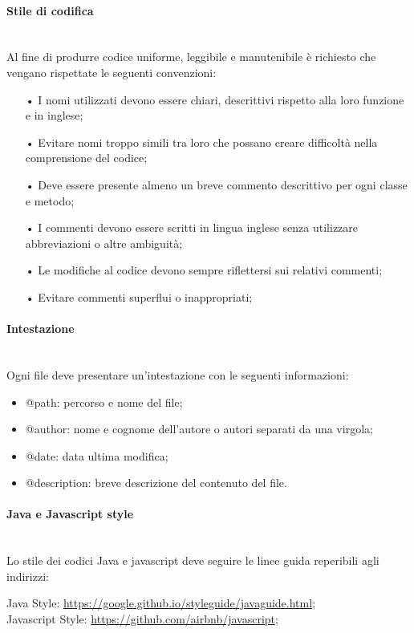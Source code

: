 \paragraph{Stile di codifica}\mbox{}\\
Al fine di produrre codice uniforme, leggibile e manutenibile è richiesto che vengano rispettate
le seguenti convenzioni:
\begin{itemize}
\item[•] I nomi utilizzati devono essere chiari, descrittivi rispetto alla loro funzione e in inglese;
\item[•] Evitare nomi troppo simili tra loro che possano creare difficoltà nella comprensione del codice;
\item[•] Deve essere presente almeno un breve commento descrittivo per ogni classe e metodo;
\item[•] I commenti devono essere scritti in lingua inglese senza utilizzare abbreviazioni o altre ambiguità;
\item[•] Le modifiche al codice devono sempre riflettersi sui relativi commenti;
\item[•] Evitare commenti superflui o  inappropriati;
\end{itemize}

\paragraph{Intestazione}\mbox{}\\
Ogni file deve presentare un'intestazione con le seguenti informazioni:
\begin{itemize}
\item @path: percorso e nome del file;
\item @author: nome e cognome dell'autore o autori separati da una virgola;
\item @date: data ultima modifica;
\item @description: breve descrizione del contenuto del file.
\end{itemize}


\paragraph{Java e Javascript style}\mbox{}\\
Lo stile dei codici Java e javascript deve seguire le linee guida reperibili agli indirizzi:\\
\begin{center}
Java Style: \url{https://google.github.io/styleguide/javaguide.html};\\
Javascript Style: \url{https://github.com/airbnb/javascript};
\end{center}

